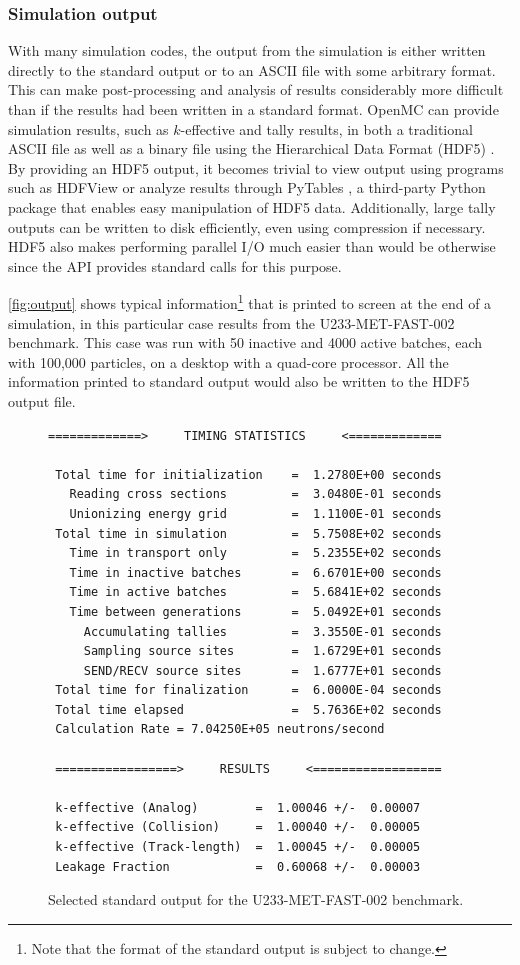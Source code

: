 \documentclass[authoryear,preprint]{elsarticle}
\begin{document}
\subsubsection{Simulation output}

With many simulation codes, the output from the simulation is either written
directly to the standard output or to an ASCII file with some arbitrary
format. This can make post-processing and analysis of results considerably more
difficult than if the results had been written in a standard format. OpenMC can
provide simulation results, such as $k$-effective and tally results, in both a
traditional ASCII file as well as a binary file using the Hierarchical Data
Format (HDF5) \citep{hdf5}. By providing an HDF5 output, it becomes trivial to
view output using programs such as HDFView or analyze results through PyTables
\citep{pytables}, a third-party Python package that enables easy manipulation of
HDF5 data. Additionally, large tally outputs can be written to disk efficiently,
even using compression if necessary. HDF5 also makes performing parallel I/O
much easier than would be otherwise since the API provides standard calls for
this purpose.

\autoref{fig:output} shows typical information\footnote{Note that the format of
  the standard output is subject to change.} that is printed to screen at the
end of a simulation, in this particular case results from the U233-MET-FAST-002
benchmark. This case was run with 50 inactive and 4000 active batches, each with
100,000 particles, on a desktop with a quad-core processor. All the information
printed to standard output would also be written to the HDF5 output file.

\begin{figure}
  \small{
    \begin{verbatim}
=============>     TIMING STATISTICS     <=============

 Total time for initialization    =  1.2780E+00 seconds
   Reading cross sections         =  3.0480E-01 seconds
   Unionizing energy grid         =  1.1100E-01 seconds
 Total time in simulation         =  5.7508E+02 seconds
   Time in transport only         =  5.2355E+02 seconds
   Time in inactive batches       =  6.6701E+00 seconds
   Time in active batches         =  5.6841E+02 seconds
   Time between generations       =  5.0492E+01 seconds
     Accumulating tallies         =  3.3550E-01 seconds
     Sampling source sites        =  1.6729E+01 seconds
     SEND/RECV source sites       =  1.6777E+01 seconds
 Total time for finalization      =  6.0000E-04 seconds
 Total time elapsed               =  5.7636E+02 seconds
 Calculation Rate = 7.04250E+05 neutrons/second

 =================>     RESULTS     <==================

 k-effective (Analog)        =  1.00046 +/-  0.00007
 k-effective (Collision)     =  1.00040 +/-  0.00005
 k-effective (Track-length)  =  1.00045 +/-  0.00005
 Leakage Fraction            =  0.60068 +/-  0.00003
    \end{verbatim}
  }
  \caption{Selected standard output for the U233-MET-FAST-002 benchmark.}
  \label{fig:output}
\end{figure}
\end{document}

